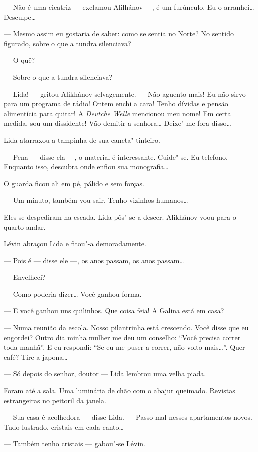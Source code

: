 --- Não é uma cicatriz --- exclamou Alilhánov ---, é um furúnculo. Eu o
arranhei\ldots{} Desculpe\ldots{}

--- Mesmo assim eu gostaria de saber: como se sentia no Norte? No
sentido figurado, sobre o que a tundra silenciava?

--- O quê?

--- Sobre o que a tundra silenciava?

--- Lida! --- gritou Alikhánov selvagemente. --- Não aguento mais! Eu
não sirvo para um programa de rádio! Ontem enchi a cara! Tenho dívidas e
pensão alimentícia para quitar! A \emph{Deutche Welle} mencionou meu
nome! Em certa medida, sou um dissidente! Vão demitir a senhora\ldots{}
Deixe"-me fora disso\ldots{}

Lida atarraxou a tampinha de sua caneta"-tinteiro.

--- Pena --- disse ela ---, o material é interessante. Cuide"-se. Eu
telefono. Enquanto isso, descubra onde enfiou sua monografia\ldots{}

O guarda ficou ali em pé, pálido e sem forças.

--- Um minuto, também vou sair. Tenho vizinhos humanos\ldots{}

Eles se despediram na escada. Lida pôs"-se a descer. Alikhánov voou para
o quarto andar.

Lévin abraçou Lida e fitou"-a demoradamente.

--- Pois é --- disse ele ---, os anos passam, os anos passam\ldots{}

--- Envelheci?

--- Como poderia dizer\ldots{} Você ganhou forma.

--- E você ganhou uns quilinhos. Que coisa feia! A Galina está em casa?

--- Numa reunião da escola. Nosso pilantrinha está crescendo. Você disse
que eu engordei? Outro dia minha mulher me deu um conselho: ``Você
precisa correr toda manhã''. E eu respondi: ``Se eu me puser a correr,
não volto mais\ldots{}''. Quer café? Tire a japona\ldots{}

--- Só depois do senhor, doutor --- Lida lembrou uma velha piada.

Foram até a sala. Uma luminária de chão com o abajur queimado. Revistas
estrangeiras no peitoril da janela.

--- Sua casa é acolhedora --- disse Lida. --- Passo mal nesses
apartamentos novos. Tudo lustrado, cristais em cada canto\ldots{}

--- Também tenho cristais --- gabou"-se Lévin.

